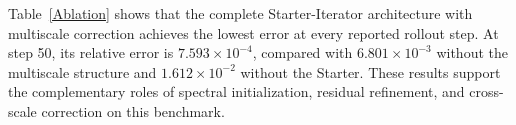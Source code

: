 \documentclass[preprint,numbers,sort&compress]{elsarticle}
\begin{document}
			
			Table~\ref{Ablation} shows that the complete Starter-Iterator architecture with multiscale correction achieves the lowest error at every reported rollout step. At step 50, its relative error is
			$7.593\times10^{-4}$, compared with $6.801\times10^{-3}$
			without the multiscale structure and $1.612\times10^{-2}$
			without the Starter. These results support the complementary
			roles of spectral initialization, residual refinement, and
			cross-scale correction on this benchmark.
			
			
			
			
			
\end{document}
